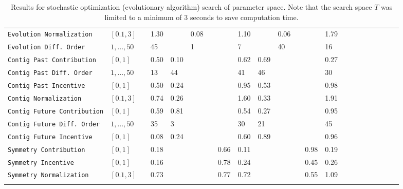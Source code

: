 \documentclass[twocolumn]{article}
\begin{document}
\begin{table}[h]
{\begin{tabular}{llll@{}llllllllllllllllll@{}}
		\texttt{Evolution Normalization}    & $[0.1,3]$         &            & 1.30  &      & 0.08 &      &      & 1.10 &      & 0.06 &      &      & 1.79 &  \\
		\texttt{Evolution Diff. Order}      & $1,\ldots,50$     &            & 45    &      & 1    &      &      & 7    &      & 40   &      &      & 16   &  \\ \midrule
		\texttt{Contig Past Contribution}   & $[0,1]$           &            & 0.50  & 0.10 &      &      &      & 0.62 & 0.69 &      &      &      & 0.27 &  \\
		\texttt{Contig Past Diff. Order}    & $1,\ldots,50$     &            & 13    & 44   &      &      &      & 41   & 46   &      &      &      & 30   &  \\
		\texttt{Contig Past Incentive}      & $[0,1]$           &            & 0.50  & 0.24 &      &      &      & 0.95 & 0.53 &      &      &      & 0.98 &  \\
		\texttt{Contig Normalization}       & $[0.1,3]$         &            & 0.74  & 0.26 &      &      &      & 1.60 & 0.33 &      &      &      & 1.91 &  \\
		\texttt{Contig Future Contribution} & $[0,1]$           &            & 0.59  & 0.81 &      &      &      & 0.54 & 0.27 &      &      &      & 0.95 &  \\
		\texttt{Contig Future Diff. Order}  & $1,\ldots,50$     &            & 35    & 3    &      &      &      & 30   & 21   &      &      &      & 45   &  \\
		\texttt{Contig Future Incentive}    & $[0,1]$           &            & 0.08  & 0.24 &      &      &      & 0.60 & 0.89 &      &      &      & 0.96 &  \\ \midrule
		\texttt{Symmetry Contribution}      & $[0,1]$           &            & 0.18  &      &      &      & 0.66 & 0.11 &      &      &      & 0.98 & 0.19 &  \\
		\texttt{Symmetry Incentive}         & $[0,1]$           &            & 0.16  &      &      &      & 0.78 & 0.24 &      &      &      & 0.45 & 0.26 &  \\
		\texttt{Symmetry Normalization}     & $[0.1,3]$         &            & 0.73  &      &      &      & 0.77 & 0.72 &      &      &      & 0.55 & 1.09 &  \\ \bottomrule
		                                    &                   &
	\end{tabular}
}
	\caption{Results for stochastic optimization (evolutionary algorithm) search of parameter space. Note that the search space $T$ was limited to a minimum of $3$ seconds to save computation time.  }
	\label{tab:parameters}
\end{table}
\end{document}
